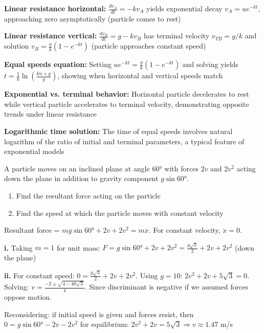 \begin{takeaways}
\item \textbf{Linear resistance horizontal:} $\frac{dv_A}{dt} = -kv_A$ yields exponential decay $v_A = ue^{-kt}$, approaching zero asymptotically (particle comes to rest)
\item \textbf{Linear resistance vertical:} $\frac{dv_B}{dt} = g - kv_B$ has terminal velocity $v_{TB} = g/k$ and solution $v_B = \frac{g}{k}(1-e^{-kt})$ (particle approaches constant speed)
\item \textbf{Equal speeds equation:} Setting $ue^{-kt} = \frac{g}{k}(1-e^{-kt})$ and solving yields $t = \frac{1}{k}\ln\left(\frac{ku+g}{g}\right)$, showing when horizontal and vertical speeds match
\item \textbf{Exponential vs. terminal behavior:} Horizontal particle decelerates to rest while vertical particle accelerates to terminal velocity, demonstrating opposite trends under linear resistance
\item \textbf{Logarithmic time solution:} The time of equal speeds involves natural logarithm of the ratio of initial and terminal parameters, a typical feature of exponential models
\end{takeaways}

\begin{problem}
A particle moves on an inclined plane at angle $60°$ with forces $2v$ and $2v^2$ acting down the plane in addition to gravity component $g\sin 60°$.

\begin{enumerate}[label=\textbf{\roman*.}]
    \item Find the resultant force acting on the particle
    \item Find the speed at which the particle moves with constant velocity
\end{enumerate}
\end{problem}

\begin{hint}
Resultant force = $mg\sin 60° + 2v + 2v^2 = m\ddot{x}$. For constant velocity, $\ddot{x} = 0$.
\end{hint}

\begin{solution}
\textbf{i.} Taking $m = 1$ for unit mass: $F = g\sin 60° + 2v + 2v^2 = \frac{g\sqrt{3}}{2} + 2v + 2v^2$ (down the plane)

\textbf{ii.} For constant speed: $0 = \frac{g\sqrt{3}}{2} + 2v + 2v^2$. Using $g = 10$: $2v^2 + 2v + 5\sqrt{3} = 0$. Solving: $v = \frac{-2 \pm \sqrt{4 - 40\sqrt{3}}}{4}$. Since discriminant is negative if we assumed forces oppose motion. 

Reconsidering: if initial speed is given and forces resist, then $0 = g\sin 60° - 2v - 2v^2$ for equilibrium: $2v^2 + 2v = 5\sqrt{3} \Rightarrow v \approx 1.47$ m/s
\end{solution}

